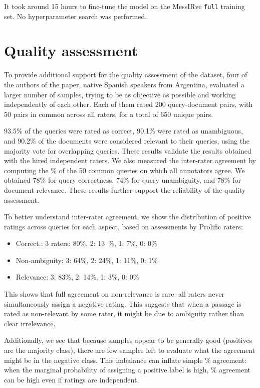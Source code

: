 \documentclass[11pt]{article}
\begin{document}
It took around 15 hours to fine-tune the model on the MessIRve \texttt{full} training set. No hyperparameter search was performed.



\section{Quality assessment} \label{app:quality_assessment}

To provide additional support for the quality assessment of the dataset, four of the authors of the paper, native Spanish speakers from Argentina, evaluated a larger number of samples, trying to be as objective as possible and working independently of each other. Each of them rated 200 query-document pairs, with 50 pairs in common across all raters, for a total of 650 unique pairs.

93.5\% of the queries were rated as correct, 90.1\% were rated as unambiguous, and 90.2\% of the documents were considered relevant to their queries, using the majority vote for overlapping queries. These results validate the results obtained with the hired independent raters. We also measured the inter-rater agreement by computing the \% of the 50 common queries on which all annotators agree.  We obtained 78\% for query correctness, 74\% for query unambiguity, and 78\% for document relevance. These results further support the reliability of the quality assessment.



To better understand inter-rater agreement, we show the distribution of positive ratings across queries for each aspect, based on assessments by Prolific raters:

\begin{itemize}[wide, nosep, itemindent=]
    \item Correct.: {3 raters: 80\%, 2: 13~\%, 1: 7\%, 0: 0\%}
    \item Non-ambiguity: {3: 64\%, 2: 24\%, 1: 11\%, 0: 1\%}
    \item Relevance: {3: 83\%, 2: 14\%, 1: 3\%, 0: 0\%}
\end{itemize}

This shows that full agreement on non-relevance is rare: all raters never simultaneously assign a negative rating. This suggests that when a passage is rated as non-relevant by some rater, it might be due to ambiguity rather than clear irrelevance.

Additionally, we see that because samples appear to be generally good (positives are the majority class), there are few samples left to evaluate what the agreement might be in the negative class. 
This imbalance can inflate simple \% agreement: when the marginal probability of assigning a positive label is high, \% agreement can be high even if ratings are independent.
\end{document}
